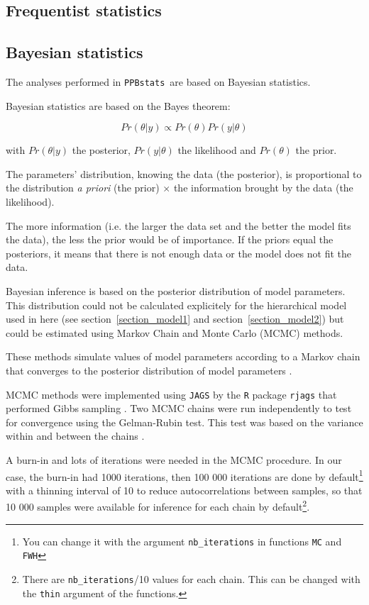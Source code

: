 \documentclass{article}\usepackage[]{graphicx}\usepackage[]{color}
\newcommand{\pack}{\texttt{PPBstats}}
\begin{document}
\subsection{Frequentist statistics}



\subsection{Bayesian statistics}
\label{section_bayes}

The analyses performed in \pack~are based on Bayesian statistics.

Bayesian statistics are based on the Bayes theorem:

\begin{displaymath}
Pr(\theta|y) \propto Pr(\theta) Pr(y|\theta)
\end{displaymath}

with 
$Pr(\theta|y)$ the posterior, 
$Pr(y|\theta)$ the likelihood and 
$Pr(\theta)$ the prior.

The parameters' distribution, knowing the data (the posterior), is proportional to the distribution \textit{a  priori} (the prior) $\times$ the information brought by the data (the likelihood).

The more information (i.e. the larger the data set and the better the model fits the data), the less the prior would be of importance.
If the priors equal the posteriors, it means that there is not enough data or the model does not fit the data.


Bayesian inference is based on the posterior distribution of model parameters.
This distribution could not be calculated explicitely for the hierarchical model used in here (see section~\ref{section_model1} and section~\ref{section_model2}) but could be estimated using Markov Chain and Monte Carlo (MCMC) methods.

These methods simulate values of model parameters according to a Markov chain that converges to the posterior distribution of model parameters \citep{robert_bayesian_2001}.

MCMC methods were implemented using \texttt{JAGS} by the \texttt{R} package \texttt{rjags} that performed Gibbs sampling \citep{robert_bayesian_2001}.
Two MCMC chains were run independently to test for convergence using the Gelman-Rubin test.
This test was based on the variance within and between the chains \citep{gelman_inference_1992}.

A burn-in and lots of iterations were needed in the MCMC procedure.
In our case, the burn-in had 1000 iterations, then 100 000 iterations are done by default\footnote{You can change it with the argument \texttt{nb\_iterations} in functions \texttt{MC} and \texttt{FWH}} with a thinning interval of 10 to reduce autocorrelations between samples, so that 10 000 samples were available for inference for each chain by default\footnote{There are \texttt{nb\_iterations}/10 values for each chain. This can be changed with the \texttt{thin} argument of the functions.}.
 
\end{document}
